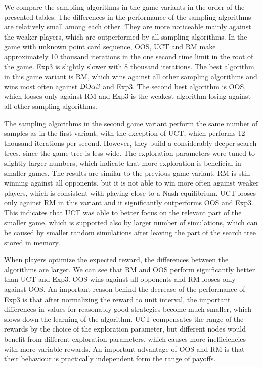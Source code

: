 We compare the sampling algorithms in the game variants in the order of the presented tables.
The differences in the performance of the sampling algorithms are relatively small among each other.
They are more noticeable mainly against the weaker players, which are outperformed by all sampling algorithms.
In the game with unknown point card sequence, OOS, UCT and RM make approximately 10 thousand iterations in the one second time limit in the root of the game. Exp3 is slightly slower with 8 thousand iterations.
The best algorithm in this game variant is RM, which wins against all other sampling algorithms and wins most often against $\textrm{DO}\alpha\beta$ and Exp3.
The second best algorithm is OOS, which looses only against RM and Exp3 is the weakest algorithm losing against all other sampling algorithms.

The sampling algorithms in the second game variant perform the same number of samples as in the first variant, with the exception of UCT, which performs 12 thousand iterations per second.
However, they build a considerably deeper search trees, since the game tree is less wide.
The exploration parameters were tuned to slightly larger numbers, which indicate that more exploration is beneficial in smaller games.
The results are similar to the previous game variant.
RM is still winning against all opponents, but it is not able to win more often against weaker players, which is consistent with playing close to a Nash equilibrium.
UCT looses only against RM in this variant and it significantly outperforms OOS and Exp3.
This indicates that UCT was able to better focus on the relevant part of the smaller game, which is supported also by larger number of simulations, which can be caused by smaller random simulations after leaving the part of the search tree stored in memory.

When players optimize the expected reward, the differences between the algorithms are larger. 
We can see that RM and OOS perform significantly better than UCT and Exp3.
OOS wins against all opponents and RM looses only against OOS.
An important reason behind the decrease of the performance of Exp3 is that after normalizing the reward to unit interval, the important differences in values for reasonably good strategies become much smaller, which slows down the learning of the algorithm.
UCT compensates the range of the rewards by the choice of the exploration parameter, but different nodes would benefit from different exploration parameters, which causes more inefficiencies with more variable rewards.
An important advantage of OOS and RM is that their behaviour is practically independent form the range of payoffs.

